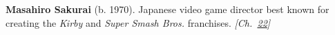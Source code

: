 \textbf{Masahiro Sakurai} (b. 1970). Japanese video game director best known for creating the \emph{Kirby} and \emph{Super Smash Bros.} franchises. \emph{[Ch.~\hyperref[ch:minecraftcreeper]{22}]}

